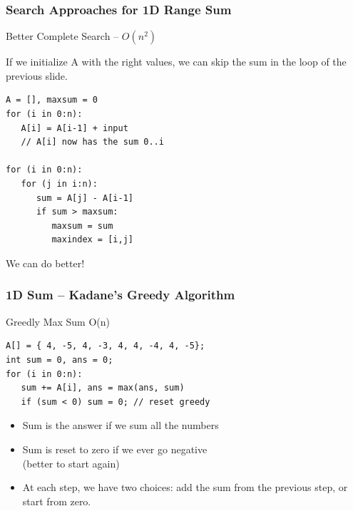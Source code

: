 \documentclass{beamer}
\begin{document}
\begin{frame}[fragile]
  \frametitle{Search Approaches for 1D Range Sum}
  \begin{block}{Better Complete Search -- $O(n^2)$}

    If we initialize A with the right values, we can skip the sum in
    the loop of the previous slide.

{\smaller
\begin{verbatim}
A = [], maxsum = 0
for (i in 0:n):
   A[i] = A[i-1] + input
   // A[i] now has the sum 0..i

for (i in 0:n):
   for (j in i:n):
      sum = A[j] - A[i-1]
      if sum > maxsum:
         maxsum = sum
         maxindex = [i,j]
\end{verbatim}
}
  \end{block}

  We can do better!
\end{frame}

\begin{frame}[fragile]
  \frametitle{1D Sum -- Kadane's Greedy Algorithm}
  \begin{block}{Greedly Max Sum O(n)}
      {\smaller
\begin{verbatim}
A[] = { 4, -5, 4, -3, 4, 4, -4, 4, -5};
int sum = 0, ans = 0;
for (i in 0:n):
   sum += A[i], ans = max(ans, sum)
   if (sum < 0) sum = 0; // reset greedy
\end{verbatim}
      }
  \end{block}

\begin{itemize}
\item Sum is the answer if we sum all the numbers
\item Sum is reset to zero if we ever go negative\\
  (better to start again)
\item At each step, we have two choices: add the sum from the previous
  step, or start from zero.
\end{itemize}
\end{frame}
\end{document}
